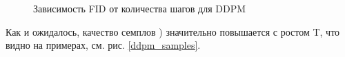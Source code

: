 \documentclass{article}
\begin{document}
\begin{figure}[H]
	\caption{Зависимость FID от количества шагов для DDPM}\label{ddpm_fid}
\end{figure}

Как и ожидалось, качество семплов ) значительно повышается с ростом T, что видно на примерах, см. рис. \ref{ddpm_samples}.
\end{document}
